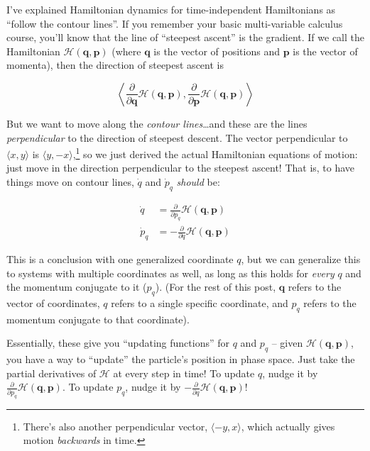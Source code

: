 \documentclass[]{article}
\begin{document}
I've explained Hamiltonian dynamics for time-independent Hamiltonians as
``follow the contour lines''. If you remember your basic multi-variable calculus
course, you'll know that the line of ``steepest ascent'' is the gradient. If we
call the Hamiltonian \(\mathcal{H}(\mathbf{q},\mathbf{p})\) (where
\(\mathbf{q}\) is the vector of positions and \(\mathbf{p}\) is the vector of
momenta), then the direction of steepest ascent is

\[
\left \langle \frac{\partial}{\partial \mathbf{q}}
\mathcal{H}(\mathbf{q},\mathbf{p}), \frac{\partial}{\partial \mathbf{p}}
\mathcal{H}(\mathbf{q},\mathbf{p}) \right \rangle
\]

But we want to move along the \emph{contour lines}\ldots and these are the lines
\emph{perpendicular} to the direction of steepest descent. The vector
perpendicular to \(\langle x, y \rangle\) is
\(\langle y, -x \rangle\),\footnote{There's also another perpendicular vector,
  \(\langle -y, x \rangle\), which actually gives motion \emph{backwards} in
  time.} so we just derived the actual Hamiltonian equations of motion: just
move in the direction perpendicular to the steepest ascent! That is, to have
things move on contour lines, \(\dot{q}\) and \(\dot{p}_q\) \emph{should} be:

\[
\begin{aligned}
\dot{q} & = \frac{\partial}{\partial p_q} \mathcal{H}(\mathbf{q},\mathbf{p}) \\
\dot{p}_q & = - \frac{\partial}{\partial q} \mathcal{H}(\mathbf{q},\mathbf{p})
\end{aligned}
\]

This is a conclusion with one generalized coordinate \(q\), but we can
generalize this to systems with multiple coordinates as well, as long as this
holds for \emph{every} \(q\) and the momentum conjugate to it (\(p_q\)). (For
the rest of this post, \(\mathbf{q}\) refers to the vector of coordinates, \(q\)
refers to a single specific coordinate, and \(p_q\) refers to the momentum
conjugate to that coordinate).

Essentially, these give you ``updating functions'' for \(q\) and \(p_q\) --
given \(\mathcal{H}(\mathbf{q},\mathbf{p})\), you have a way to ``update'' the
particle's position in phase space. Just take the partial derivatives of
\(\mathcal{H}\) at every step in time! To update \(q\), nudge it by
\(\frac{\partial}{\partial p_q} \mathcal{H}(\mathbf{q},\mathbf{p})\). To update
\(p_q\), nudge it by
\(-\frac{\partial}{\partial q} \mathcal{H}(\mathbf{q},\mathbf{p})\)!
\end{document}
